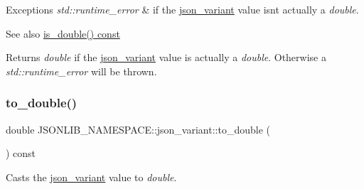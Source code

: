 \begin{DoxyExceptions}{Exceptions}
{\em std\+::runtime\+\_\+error} & if the \hyperlink{classJSONLIB__NAMESPACE_1_1json__variant}{json\+\_\+variant} value isn\textquotesingle{}t actually a {\itshape double}. \\
\hline
\end{DoxyExceptions}
\begin{DoxySeeAlso}{See also}
\hyperlink{classJSONLIB__NAMESPACE_1_1json__variant_a7f294ce9b078aca12e0f96df7275ff0b}{is\+\_\+double() const} 
\end{DoxySeeAlso}
\begin{DoxyReturn}{Returns}
{\itshape double} if the \hyperlink{classJSONLIB__NAMESPACE_1_1json__variant}{json\+\_\+variant} value is actually a {\itshape double}. Otherwise a {\itshape std\+::runtime\+\_\+error} will be thrown. 
\end{DoxyReturn}
\mbox{\label{classJSONLIB__NAMESPACE_1_1json__variant_a9a5c7a9568e052b4a38d1b6107038d7b}} 
\subsubsection{\texorpdfstring{to\+\_\+double()}{to\_double()}\hspace{0.1cm}{\footnotesize\ttfamily [2/2]}}
{\footnotesize\ttfamily double J\+S\+O\+N\+L\+I\+B\+\_\+\+N\+A\+M\+E\+S\+P\+A\+C\+E\+::json\+\_\+variant\+::to\+\_\+double (\begin{DoxyParamCaption}{ }\end{DoxyParamCaption}) const}



Casts the \hyperlink{classJSONLIB__NAMESPACE_1_1json__variant}{json\+\_\+variant} value to {\itshape double}. 


